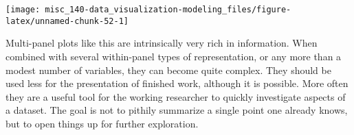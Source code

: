 \documentclass[]{book}
\newenvironment{Shaded}{\begin{snugshade}}{\end{snugshade}}
\newcommand{\DataTypeTok}[1]{\textcolor[rgb]{0.13,0.29,0.53}{#1}}
\newcommand{\KeywordTok}[1]{\textcolor[rgb]{0.13,0.29,0.53}{\textbf{#1}}}
\newcommand{\NormalTok}[1]{#1}
\newcommand{\OperatorTok}[1]{\textcolor[rgb]{0.81,0.36,0.00}{\textbf{#1}}}
\newcommand{\StringTok}[1]{\textcolor[rgb]{0.31,0.60,0.02}{#1}}
\begin{document}
\begin{Shaded}
\end{Shaded}

\begin{center}\texttt{[image: misc\_140-data\_visualization-modeling\_files/figure-latex/unnamed-chunk-52-1]} \end{center}

Multi-panel plots like this are intrinsically very rich in information. When combined with several within-panel types of representation, or any more than a modest number of variables, they can become quite complex. They should be used less for the presentation of finished work, although it is possible. More often they are a useful tool for the working researcher to quickly investigate aspects of a dataset. The goal is not to pithily summarize a single point one already knows, but to open things up for further exploration.


\end{document}
